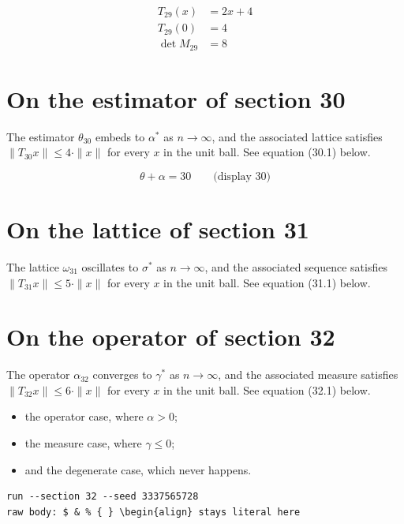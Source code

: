 \documentclass{article}
\begin{document}
\begin{align}
T_{29}(x) &= 2 x + 4 \\
T_{29}(0) &= 4 \\
\det M_{29} &= 8
\end{align}

\section{On the estimator of section 30}
The estimator $\theta_{30}$ embeds to $\alpha^{*}$ as $n \to \infty$,
and the associated lattice satisfies $\|T_{30} x\| \leq 4 \cdot \|x\|$
for every $x$ in the unit ball. See equation (30.1) below.

$$
\theta + \alpha = 30 \qquad \text{(display 30)}
$$

\section{On the lattice of section 31}
The lattice $\omega_{31}$ oscillates to $\sigma^{*}$ as $n \to \infty$,
and the associated sequence satisfies $\|T_{31} x\| \leq 5 \cdot \|x\|$
for every $x$ in the unit ball. See equation (31.1) below.

\section{On the operator of section 32}
The operator $\alpha_{32}$ converges to $\gamma^{*}$ as $n \to \infty$,
and the associated measure satisfies $\|T_{32} x\| \leq 6 \cdot \|x\|$
for every $x$ in the unit ball. See equation (32.1) below.

\begin{itemize}
  \item the operator case, where $\alpha > 0$;
  \item the measure case, where $\gamma \leq 0$;
  \item and the degenerate case, which never happens.
\end{itemize}

\begin{verbatim}
run --section 32 --seed 3337565728
raw body: $ & % { } \begin{align} stays literal here
\end{verbatim}
\end{document}
